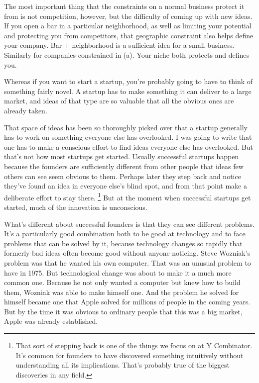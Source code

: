 \documentclass[12pt]{book}
\begin{document}
The most important thing that the constraints on a normal business
protect it from is not competition, however, but the difficulty of
coming up with new ideas. If you open a bar in a particular
neighborhood, as well as limiting your potential and protecting you from
competitors, that geographic constraint also helps define your company.
Bar + neighborhood is a sufficient idea for a small business. Similarly
for companies constrained in (a). Your niche both protects and defines
you.

Whereas if you want to start a startup, you're probably going to have to
think of something fairly novel. A startup has to make something it can
deliver to a large market, and ideas of that type are so valuable that
all the obvious ones are already taken.

That space of ideas has been so thoroughly picked over that a startup
generally has to work on something everyone else has overlooked. I was
going to write that one has to make a conscious effort to find ideas
everyone else has overlooked. But that's not how most startups get
started. Usually successful startups happen because the founders are
sufficiently different from other people that ideas few others can see
seem obvious to them. Perhaps later they step back and notice they've
found an idea in everyone else's blind spot, and from that point make a
deliberate effort to stay there. \footnote{That sort of stepping back is one of the things we focus on at Y
Combinator. It's common for founders to have discovered something
intuitively without understanding all its implications. That's probably
true of the biggest discoveries in any field.} But at the
moment when successful startups get started, much of the innovation is
unconscious.

What's different about successful founders is that they can see
different problems. It's a particularly good combination both to be good
at technology and to face problems that can be solved by it, because
technology changes so rapidly that formerly bad ideas often become good
without anyone noticing. Steve Wozniak's problem was that he wanted his
own computer. That was an unusual problem to have in 1975. But
technological change was about to make it a much more common one.
Because he not only wanted a computer but knew how to build them,
Wozniak was able to make himself one. And the problem he solved for
himself became one that Apple solved for millions of people in the
coming years. But by the time it was obvious to ordinary people that
this was a big market, Apple was already established.
\end{document}
